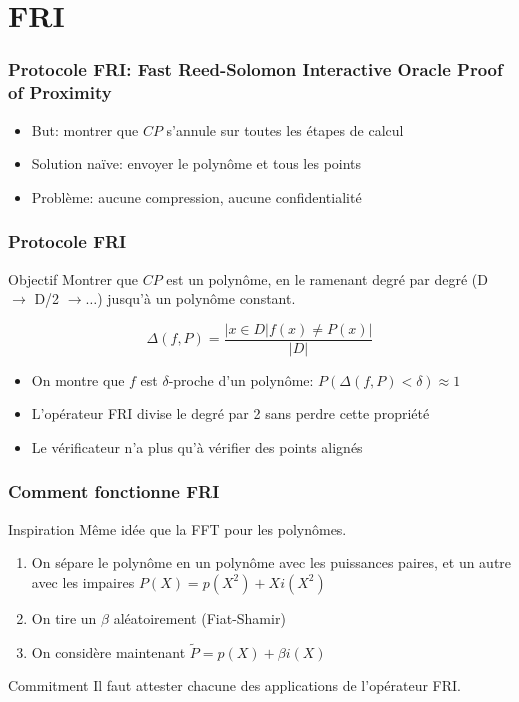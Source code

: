 \documentclass{beamer}
\begin{document}
\section{FRI}
\begin{frame}
\frametitle{Protocole FRI: Fast Reed-Solomon Interactive Oracle Proof of Proximity}

\begin{itemize}
    \item But: montrer que $CP$ s'annule sur toutes les étapes de calcul
    \item Solution naïve: envoyer le polynôme et tous les points
    \item Problème: aucune compression, aucune confidentialité
\end{itemize}

\end{frame}

\begin{frame}
\frametitle{Protocole FRI}

\begin{block}{Objectif}
Montrer que $CP$ est un polynôme, en le ramenant degré par degré (D $\to$ D/2 $\to \dots$) jusqu'à un polynôme constant.
\end{block}

$$\Delta(f,P) = \frac{|{x\in D | f(x) \ne P(x)}|}{|D|}$$

\begin{itemize}
    \item On montre que $f$ est $\delta$-proche d'un polynôme: $P(\Delta(f,P) < \delta) \approx 1$
    \item L'opérateur FRI divise le degré par 2 sans perdre cette propriété
    \item Le vérificateur n'a plus qu'à vérifier des points alignés
\end{itemize}

\end{frame}

\begin{frame}
\frametitle{Comment fonctionne FRI}

\begin{block}{Inspiration}
Même idée que la FFT pour les polynômes.
\end{block}

\begin{enumerate}
  \item On sépare le polynôme en un polynôme avec les puissances paires, et un autre avec les impaires $P(X) = p(X^2) + Xi(X^2)$
  \item On tire un $\beta$ aléatoirement (Fiat-Shamir)
  \item On considère maintenant $\tilde{P} = p(X) + \beta i(X)$
\end{enumerate}

\begin{block}{Commitment}
Il faut attester chacune des applications de l'opérateur FRI.
\end{block}

\end{frame}
\end{document}
